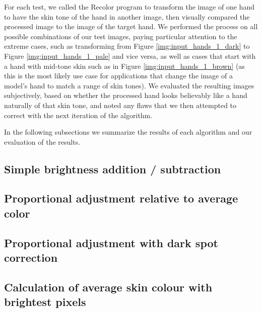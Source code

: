  For each test, we called the Recolor program to transform the image of one hand to have the skin tone of the hand in another image, then visually compared the processed image to the image of the target hand. We performed the process on all possible combinations of our test images, paying particular attention to the extreme cases, such as transforming from Figure \ref{img:input_hands_1_dark} to Figure \ref{img:input_hands_1_pale} and vice versa, as well as cases that start with a hand with mid-tone skin such as in Figure \ref{img:input_hands_1_brown} (as this is the most likely use case for applications that change the image of a model's hand to match a range of skin tones). We evaluated the resulting images subjectively, based on whether the processed hand looks believably like a hand naturally of that skin tone, and noted any flaws that we then attempted to correct with the next iteration of the algorithm.

In the following subsections we summarize the results of each algorithm and our evaluation of the results.

\subsection{Simple brightness addition / subtraction}


\subsection{Proportional adjustment relative to average color}


\subsection{Proportional adjustment with dark spot correction}


\subsection{Calculation of average skin colour with brightest pixels}

